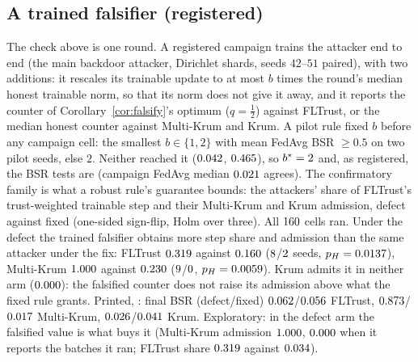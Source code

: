 \documentclass[journal]{IEEEtran}
\begin{document}
\subsection{A trained falsifier (registered)}
\label{sup:r1}
The check above is one round. A registered campaign trains the attacker end to end
(the main backdoor attacker, Dirichlet shards, seeds $42$--$51$ paired), with two
additions: it rescales its trainable update to at most $b$ times the round's median
honest trainable norm, so that its norm does not give it away, and it reports the
counter of Corollary~\ref{cor:falsify}'s optimum ($q=\tfrac12$) against FLTrust, or the
median honest counter against Multi-Krum and Krum. A pilot rule fixed $b$ before any
campaign cell: the smallest $b\in\{1,2\}$ with mean FedAvg BSR $\ge0.5$ on two pilot
seeds, else $2$. Neither reached it ($0.042$, $0.465$), so
$b^*=2$ and, as registered, the BSR tests are \rOnePrimUninf{} (campaign FedAvg
median $0.021$ agrees). The confirmatory family is what a robust rule's
guarantee bounds: the attackers' share of FLTrust's trust-weighted trainable step and
their Multi-Krum and Krum admission, defect against fixed (one-sided sign-flip, Holm
over three). All $160$ cells ran. Under the defect the trained falsifier
obtains more step share and admission than the same attacker under the fix: FLTrust
$0.319$ against $0.160$ ($8$/$2$ seeds,
$p_H=0.0137$), Multi-Krum $1.000$ against $0.230$
($9$/$0$, $p_H=0.0059$). Krum admits it in neither arm
($0.000$): the falsified counter does not raise its admission above what the
fixed rule grants. Printed, \rOnePrimUninf{}: final BSR (defect/fixed)
$0.062$/$0.056$ FLTrust, $0.873$/$0.017$ Multi-Krum,
$0.026$/$0.041$ Krum. Exploratory: in the defect arm the falsified
value is what buys it (Multi-Krum admission $1.000$, $0.000$ when it
reports the batches it ran; FLTrust share $0.319$ against $0.034$).
\end{document}
